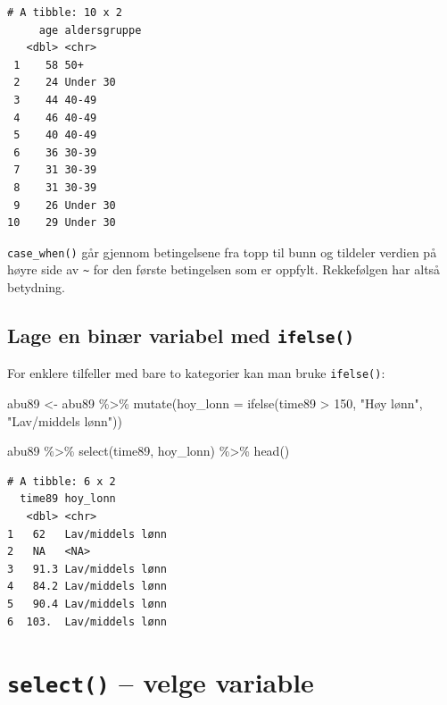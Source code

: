 \documentclass[
  norsk,
  letterpaper,
  DIV=11,
  numbers=noendperiod]{scrreprt}
\newenvironment{Shaded}{\begin{snugshade}}{\end{snugshade}}
\newcommand{\AttributeTok}[1]{\textcolor[rgb]{0.40,0.45,0.13}{#1}}
\newcommand{\DecValTok}[1]{\textcolor[rgb]{0.68,0.00,0.00}{#1}}
\newcommand{\FunctionTok}[1]{\textcolor[rgb]{0.28,0.35,0.67}{#1}}
\newcommand{\NormalTok}[1]{\textcolor[rgb]{0.00,0.23,0.31}{#1}}
\newcommand{\OtherTok}[1]{\textcolor[rgb]{0.00,0.23,0.31}{#1}}
\newcommand{\SpecialCharTok}[1]{\textcolor[rgb]{0.37,0.37,0.37}{#1}}
\newcommand{\StringTok}[1]{\textcolor[rgb]{0.13,0.47,0.30}{#1}}
\theoremstyle{definition}
\theoremstyle{remark}
\begin{document}
\begin{verbatim}
# A tibble: 10 x 2
     age aldersgruppe
   <dbl> <chr>       
 1    58 50+         
 2    24 Under 30    
 3    44 40-49       
 4    46 40-49       
 5    40 40-49       
 6    36 30-39       
 7    31 30-39       
 8    31 30-39       
 9    26 Under 30    
10    29 Under 30    
\end{verbatim}

\texttt{case\_when()} går gjennom betingelsene fra topp til bunn og
tildeler verdien på høyre side av \texttt{\textasciitilde{}} for den
første betingelsen som er oppfylt. Rekkefølgen har altså betydning.

\subsection{\texorpdfstring{Lage en binær variabel med
\texttt{ifelse()}}{Lage en binær variabel med ifelse()}}\label{lage-en-binuxe6r-variabel-med-ifelse}

For enklere tilfeller med bare to kategorier kan man bruke
\texttt{ifelse()}:

\begin{Shaded}
\begin{Highlighting}[]
\NormalTok{abu89 }\OtherTok{\textless{}{-}}\NormalTok{ abu89 }\SpecialCharTok{\%\textgreater{}\%}
  \FunctionTok{mutate}\NormalTok{(}\AttributeTok{hoy\_lonn =} \FunctionTok{ifelse}\NormalTok{(time89 }\SpecialCharTok{\textgreater{}} \DecValTok{150}\NormalTok{, }\StringTok{"Høy lønn"}\NormalTok{, }\StringTok{"Lav/middels lønn"}\NormalTok{))}

\NormalTok{abu89 }\SpecialCharTok{\%\textgreater{}\%}
  \FunctionTok{select}\NormalTok{(time89, hoy\_lonn) }\SpecialCharTok{\%\textgreater{}\%}
  \FunctionTok{head}\NormalTok{()}
\end{Highlighting}
\end{Shaded}

\begin{verbatim}
# A tibble: 6 x 2
  time89 hoy_lonn        
   <dbl> <chr>           
1   62   Lav/middels lønn
2   NA   <NA>            
3   91.3 Lav/middels lønn
4   84.2 Lav/middels lønn
5   90.4 Lav/middels lønn
6  103.  Lav/middels lønn
\end{verbatim}

\section{\texorpdfstring{\texttt{select()} -- velge
variable}{select() -- velge variable}}\label{select-velge-variable}
\end{document}
